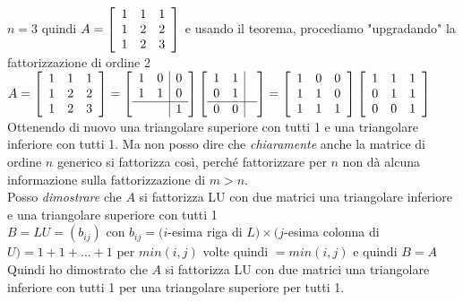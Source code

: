 \documentclass[10pt]{book}
\begin{document}
$n = 3$ quindi \begin{math}
A = \left[
\begin{array}{c c c}
	1 & 1 & 1\\
	1 & 2 & 2\\
	1 & 2 & 3
\end{array}
\right]
\end{math}
e usando il teorema, procediamo "upgradando" la fattorizzazione di ordine 2\\
\begin{math}
A = \left[
\begin{array}{c c c}
	1 & 1 & 1\\
	1 & 2 & 2\\
	1 & 2 & 3
\end{array}
\right]
= \left[
\begin{array}{c c | c}
	1 & 0 & 0\\
	1 & 1 & 0\\
	\hline
	 & & 1
\end{array}
\right]
\left[
\begin{array}{c c | c}
	1 & 1 & \\
	0 & 1 & \\
	\hline
	0 & 0 & 
\end{array}
\right]
= \left[
\begin{array}{c c c}
	1 & 0 & 0\\
	1 & 1 & 0\\
	1 & 1 & 1
\end{array}
\right]
\left[
\begin{array}{c c c}
	1 & 1 & 1\\
	0 & 1 & 1\\
	0 & 0 & 1
\end{array}
\right]
\end{math}
Ottenendo di nuovo una triangolare superiore con tutti 1 e una triangolare inferiore con tutti 1. Ma non posso dire che \textit{chiaramente} anche la matrice di ordine $n$ generico si fattorizza così, perché fattorizzare per $n$ non dà alcuna informazione sulla fattorizzazione di $m > n$.\\
Posso \textit{dimostrare} che $A$ si fattorizza LU con due matrici una triangolare inferiore e una triangolare superiore con tutti 1\\
$B = LU = (b_{ij})$ con $b_{ij} = (i$-esima riga di $L)\times(j$-esima colonna di $U) = 1 + 1 + \ldots + 1$ per $min(i, j)$ volte quindi $= min(i, j)$ e quindi $B = A$\\
Quindi ho dimostrato che $A$ si fattorizza LU con due matrici una triangolare inferiore con tutti 1 per una triangolare superiore per tutti 1.\\\\
\end{document}
